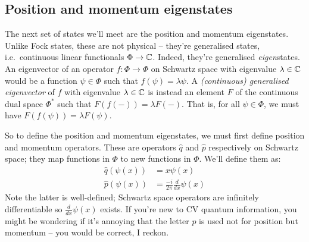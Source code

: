 \subsection{Position and momentum eigenstates}

The next set of states we'll meet are the position and momentum eigenstates.
Unlike Fock states, these are not physical -- they're generalised states, i.e.\ continuous linear functionals $\Phi \to \mathbb{C}$.
Indeed, they're generalised \textit{eigen}states.
An eigenvector of an operator $f: \Phi \to \Phi$ on Schwartz space with eigenvalue $\lambda \in \mathbb{C}$ would be a function $\psi \in \Phi$ such that $f(\psi) = \lambda \psi$.
A \textit{(continuous) generalised eigenvector} of $f$ with eigenvalue $\lambda \in \mathbb{C}$ is instead an element $F$ of the continuous dual space $\Phi^*$ such that $F(f(-)) = \lambda F(-)$.
That is, for all $\psi \in \Phi$, we must have $F(f(\psi)) = \lambda F(\psi)$.

So to define the position and momentum eigenstates, we must first define position and momentum operators.
These are operators $\hat{q}$ and $\hat{p}$ respectively on Schwartz space; they map functions in $\Phi$ to new functions in $\Phi$.
We'll define them as:
\begin{equation}
    \begin{aligned}
        \hat{q}(\psi(x)) &= x\psi(x) \\
        \hat{p}(\psi(x)) &= \frac{-i}{2\pi} \frac{d}{dx} \psi(x)
    \end{aligned}
\end{equation}
Note the latter is well-defined; Schwartz space operators are infinitely differentiable so $\frac{d}{dx} \psi(x)$ exists.
If you're new to CV quantum information, you might be wondering if it's annoying that the letter $p$ is used not for position but momentum -- you would be correct, I reckon.

